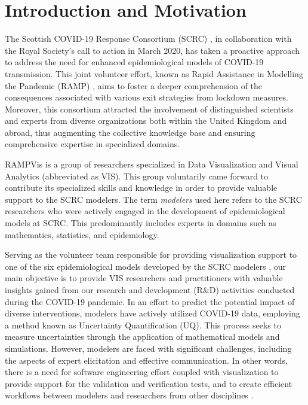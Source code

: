 \section{Introduction and Motivation}
\label{sec:intro}

The Scottish COVID-19 Response Consortium (SCRC) \cite{2020University}, in collaboration with the Royal Society's call to action in March 2020, has taken a proactive approach to address the need for enhanced epidemiological models of COVID-19 transmission.
This joint volunteer effort, known as Rapid Assistance in Modelling the Pandemic (RAMP) \cite{2020Rapid}, aims to foster a deeper comprehension of the consequences associated with various exit strategies from lockdown measures.
Moreover, this consortium attracted the involvement of distinguished scientists and experts from diverse organizations both within the United Kingdom and abroad, thus augmenting the collective knowledge base and ensuring comprehensive expertise in specialized domains.

RAMPVis \cite{2020Visualization} is a group of researchers specialized in Data Visualization and Visual Analytics (abbreviated as VIS).
This group voluntarily came forward to contribute its specialized skills and knowledge in order to provide valuable support to the SCRC modelers.
The term \textit{modelers} used here refers to the SCRC researchers who were actively engaged in the development of epidemiological models at SCRC.
This predominantly includes experts in domains such as mathematics, statistics, and epidemiology.

Serving as the volunteer team responsible for providing visualization support to one of the six epidemiological models developed by the SCRC modelers \cite{chen2022RAMPVIS}, our main objective is to provide VIS researchers and practitioners with valuable insights gained from our research and development (R\&D) activities conducted during the COVID-19 pandemic.
In an effort to predict the potential impact of diverse interventions, modelers have actively utilized COVID-19 data, employing a method known as Uncertainty Quantification (UQ).
This process seeks to measure uncertainties through the application of mathematical models and simulations.
However, modelers are faced with significant challenges, including the aspects of expert elicitation and effective communication.
In other words, there is a need for software engineering effort coupled with visualization to provide support for the validation and verification tests, and to create efficient workflows between modelers and researchers from other disciplines \cite{ackland2022Royal}.

